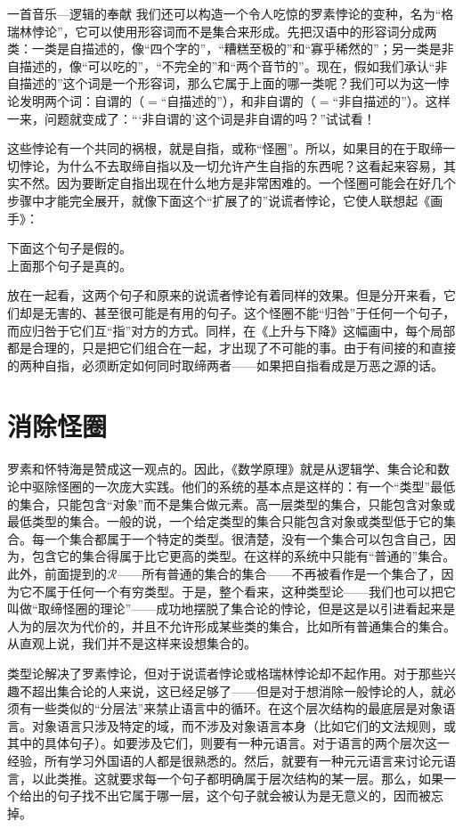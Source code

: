 \begin{intro}{一首音乐—逻辑的奉献}
我们还可以构造一个令人吃惊的罗素悖论的变种，名为“格瑞林悖论”，它可以使用形容词而不是集合来形成。先把汉语中的形容词分成两类：一类是自描述的，像“四个字的”，“糟糕至极的”和“寡乎稀然的”；另一类是非自描述的，像“可以吃的”，“不完全的”和“两个音节的”。现在，假如我们承认“非自描述的”这个词是一个形容词，那么它属于上面的哪一类呢？我们可以为这一悖论发明两个词：自谓的（$=$“自描述的”），和非自谓的（$=$“非自描述的”）。这样一来，问题就变成了：“‘非自谓的’这个词是非自谓的吗？”试试看！

这些悖论有一个共同的祸根，就是自指，或称“怪圈”。所以，如果目的在于取缔一切悖论，为什么不去取缔自指以及一切允许产生自指的东西呢？这看起来容易，其实不然。因为要断定自指出现在什么地方是非常困难的。一个怪圈可能会在好几个步骤中才能完全展开，就像下面这个“扩展了的”说谎者悖论，它使人联想起《画手》：

\begin{center}
下面这个句子是假的。\\
上面那个句子是真的。
 \end{center}

放在一起看，这两个句子和原来的说谎者悖论有着同样的效果。但是分开来看，它们却是无害的、甚至很可能是有用的句子。这个怪圈不能“归咎”于任何一个句子，而应归咎于它们互“指”对方的方式。同样，在《上升与下降》这幅画中，每个局部都是合理的，只是把它们组合在一起，才出现了不可能的事。由于有间接的和直接的两种自指，必须断定如何同时取缔两者——如果把自指看成是万恶之源的话。

\section{消除怪圈}

罗素和怀特海是赞成这一观点的。因此，《数学原理》就是从逻辑学、集合论和数论中驱除怪圈的一次庞大实践。他们的系统的基本点是这样的：有一个“类型”最低的集合，只能包含“对象”而不是集合做元素。高一层类型的集合，只能包含对象或最低类型的集合。一般的说，一个给定类型的集合只能包含对象或类型低于它的集合。每一个集合都属于一个特定的类型。很清楚，没有一个集合可以包含自己，因为，包含它的集合得属于比它更高的类型。在这样的系统中只能有“普通的”集合。此外，前面提到的$\mathscr R$——所有普通的集合的集合——不再被看作是一个集合了，因为它不属于任何一个有穷类型。于是，整个看来，这种类型论——我们也可以把它叫做“取缔怪圈的理论”——成功地摆脱了集合论的悖论，但是这是以引进看起来是人为的层次为代价的，并且不允许形成某些类的集合，比如所有普通集合的集合。从直观上说，我们并不是这样来设想集合的。

类型论解决了罗素悖论，但对于说谎者悖论或格瑞林悖论却不起作用。对于那些兴趣不超出集合论的人来说，这已经足够了——但是对于想消除一般悖论的人，就必须有一些类似的“分层法”来禁止语言中的循环。在这个层次结构的最底层是对象语言。对象语言只涉及特定的域，而不涉及对象语言本身（比如它们的文法规则，或其中的具体句子）。如要涉及它们，则要有一种元语言。对于语言的两个层次这一经验，所有学习外国语的人都是很熟悉的。然后，就要有一种元元语言来讨论元语言，以此类推。这就要求每一个句子都明确属于层次结构的某一层。那么，如果一个给出的句子找不出它属于哪一层，这个句子就会被认为是无意义的，因而被忘掉。


\end{intro}
